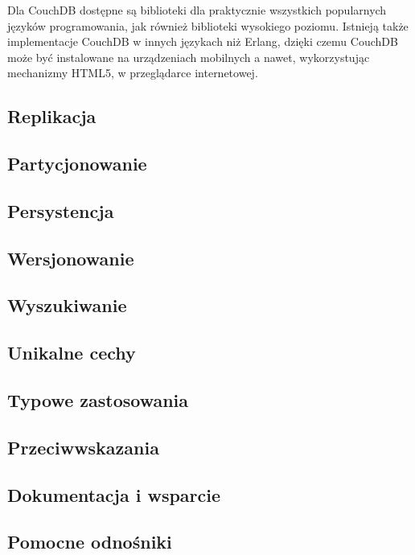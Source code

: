 Dla CouchDB dostępne są biblioteki dla praktycznie wszystkich popularnych języków programowania, jak również biblioteki wysokiego poziomu.
Istnieją także implementacje CouchDB w innych językach niż Erlang, dzięki czemu CouchDB może być instalowane na urządzeniach mobilnych a nawet, wykorzystując mechanizmy HTML5, w przeglądarce internetowej.

\subsection*{Replikacja}

\subsection*{Partycjonowanie}

\subsection*{Persystencja}

\subsection*{Wersjonowanie}

\subsection*{Wyszukiwanie}

\subsection*{Unikalne cechy}

\subsection*{Typowe zastosowania}

\subsection*{Przeciwwskazania}

\subsection*{Dokumentacja i wsparcie}

\subsection*{Pomocne odnośniki}

